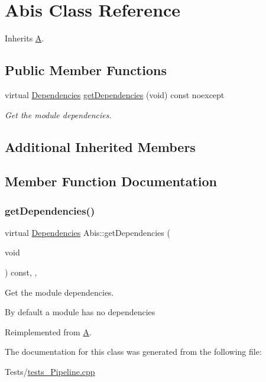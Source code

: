 \hypertarget{class_abis}{}\section{Abis Class Reference}
\label{class_abis}


Inherits \mbox{\hyperlink{class_a}{A}}.

\subsection*{Public Member Functions}
\begin{DoxyCompactItemize}
\item 
virtual \mbox{\hyperlink{classo_z_1_1_i_module_ac13210556cb2a65d186bfbe5208c666c}{Dependencies}} \mbox{\hyperlink{class_abis_a20476073293d54658c3891decbb4a725}{get\+Dependencies}} (void) const noexcept
\begin{DoxyCompactList}\small\item\em Get the module dependencies. \end{DoxyCompactList}\end{DoxyCompactItemize}
\subsection*{Additional Inherited Members}


\subsection{Member Function Documentation}
\mbox{\label{class_abis_a20476073293d54658c3891decbb4a725}} 
\subsubsection{\texorpdfstring{getDependencies()}{getDependencies()}}
{\footnotesize\ttfamily virtual \mbox{\hyperlink{classo_z_1_1_i_module_ac13210556cb2a65d186bfbe5208c666c}{Dependencies}} Abis\+::get\+Dependencies (\begin{DoxyParamCaption}\item[{void}]{ }\end{DoxyParamCaption}) const\hspace{0.3cm}{\ttfamily [inline]}, {\ttfamily [virtual]}, {\ttfamily [noexcept]}}



Get the module dependencies. 

By default a module has no dependencies 

Reimplemented from \mbox{\hyperlink{class_a_a2220cafae67f880a553d6219dfcf8581}{A}}.



The documentation for this class was generated from the following file\+:\begin{DoxyCompactItemize}
\item 
Tests/\mbox{\hyperlink{tests___pipeline_8cpp}{tests\+\_\+\+Pipeline.\+cpp}}\end{DoxyCompactItemize}
